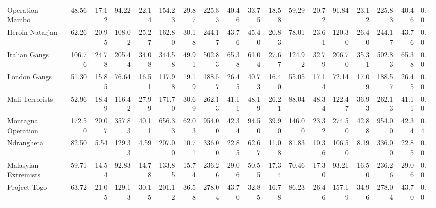\begin{tabular}{lrrrrrrrrrrrrrrrrl}
Operation Mambo      &             48.56 &  17.12 &   94.22 &  22.14 &  154.23 &  29.87 &  225.83 &  40.46 &            33.75 &   18.58 &   59.29 &   20.72 &   91.84 &   23.12 &  225.83 &  40.46 &        0.0 \\
Heroin Natarjan      &             62.26 &  20.95 &  108.02 &  25.27 &  162.80 &  30.18 &  244.17 &  43.76 &            45.40 &   20.83 &   78.01 &   23.61 &  120.30 &   26.40 &  244.17 &  43.76 &        0.0 \\
Italian Gangs        &            106.76 &  24.78 &  205.44 &  34.08 &  344.58 &  49.91 &  502.83 &  65.38 &            61.04 &   27.67 &  124.92 &   32.79 &  206.70 &   35.31 &  502.83 &  65.38 &        0.0 \\
London Gangs         &             51.30 &  15.85 &   76.64 &  16.51 &  117.98 &  19.19 &  188.57 &  26.45 &            40.73 &   16.40 &   55.05 &   17.14 &   72.14 &   17.09 &  188.57 &  26.45 &        0.0 \\
Mali Terrorists      &             52.96 &  18.49 &  116.42 &  27.99 &  171.70 &  30.69 &  262.13 &  41.11 &            48.19 &   26.21 &   88.04 &   48.34 &  122.47 &   36.93 &  262.13 &  41.11 &        0.0 \\
Montagna Operation   &            172.50 &  20.07 &  357.83 &  40.11 &  656.33 &  62.03 &  954.00 &  42.34 &            94.50 &   39.90 &  146.00 &   23.32 &  274.50 &   42.88 &  954.00 &  42.34 &        0.4 \\
Ndrangheta           &             82.50 &   5.54 &  129.33 &   4.59 &  207.00 &  10.71 &  336.00 &  22.85 &            62.67 &   11.08 &   81.83 &   10.36 &  106.50 &    8.19 &  336.00 &  22.85 &        0.0 \\
Malasyian Extremists &             59.71 &  14.54 &   92.83 &  14.78 &  133.85 &  15.74 &  236.26 &  29.06 &            50.55 &   17.34 &   70.46 &   17.30 &   93.21 &   16.50 &  236.26 &  29.06 &        0.0 \\
Project Togo         &             63.72 &  21.05 &  129.13 &  30.15 &  201.12 &  36.58 &  278.04 &  43.70 &            32.85 &   16.78 &   86.23 &   26.46 &  157.19 &   34.96 &  278.04 &  43.70 &        0.0 \\
\bottomrule
\end{tabular}
